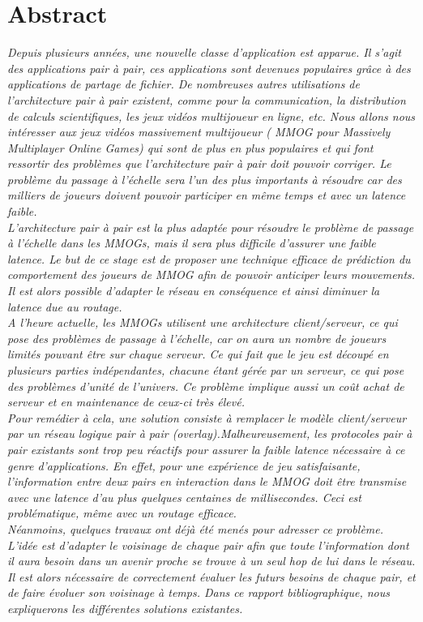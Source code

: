 \section{Abstract}

	\textit{Depuis plusieurs années, une nouvelle classe d'application est apparue. Il s'agit des applications pair à pair, ces applications sont devenues populaires grâce à des applications de partage de fichier. De nombreuses autres utilisations de l'architecture pair à pair existent, comme pour la communication, la distribution de calculs scientifiques, les jeux vidéos multijoueur en ligne, etc. Nous allons nous intéresser aux jeux vidéos massivement multijoueur ( MMOG pour Massively Multiplayer Online Games) qui sont de plus en plus populaires et qui font ressortir des problèmes que l'architecture pair à pair doit pouvoir corriger. Le problème du passage à l'échelle sera l'un des plus importants à résoudre car des milliers de joueurs doivent pouvoir participer en même temps et avec un latence faible.\\ 
	L'architecture pair à pair est la plus adaptée pour résoudre le problème de passage à l'échelle dans les MMOGs, mais il sera plus difficile d'assurer une faible latence. Le but de ce stage est de proposer une technique efficace de prédiction du comportement des joueurs de MMOG afin de pouvoir anticiper leurs mouvements. Il est alors possible d’adapter le réseau en conséquence et ainsi diminuer la latence due au routage.\\ 
	A l'heure actuelle, les MMOGs utilisent une architecture client/serveur, ce qui pose des problèmes de passage à  l'échelle, car on aura un nombre de joueurs limités pouvant être sur chaque serveur. Ce qui fait que le jeu est découpé en plusieurs parties indépendantes, chacune étant gérée par un serveur, ce qui pose des problèmes d'unité de l'univers. Ce problème implique aussi un coût achat de serveur et en maintenance de ceux-ci très élevé.\\
	Pour remédier à cela, une solution consiste à remplacer le modèle client/serveur par un réseau logique pair à pair (overlay).Malheureusement, les protocoles pair à pair existants sont trop peu réactifs pour assurer la faible latence nécessaire à ce genre d’applications. En effet, pour une expérience de jeu satisfaisante, l’information entre deux pairs en interaction dans le MMOG doit être transmise avec une latence d’au plus quelques centaines de millisecondes. Ceci est problématique, même avec un routage efficace.\\
	Néanmoins, quelques travaux ont déjà été menés pour adresser ce problème. L’idée est d’adapter le voisinage de chaque pair afin que toute l’information dont il aura besoin dans un avenir proche se trouve à un seul hop de lui dans le réseau. Il est alors nécessaire de correctement évaluer les futurs besoins de chaque pair, et de faire évoluer son voisinage à temps. Dans ce rapport bibliographique, nous expliquerons les différentes solutions existantes.
}

